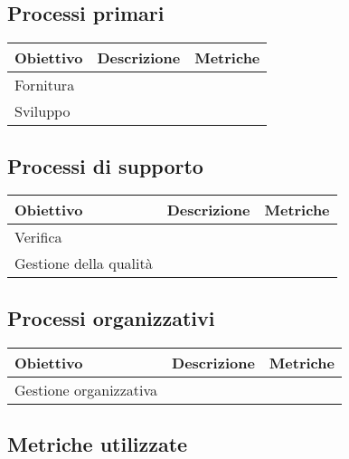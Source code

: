 \documentclass[10pt, a4paper]{article}
\begin{document}
\subsection{Processi primari}
    {\renewcommand{\arraystretch}{1.5}
    \begin{tabularx}{\textwidth}{p{}|p{}|X}
    \textbf{Obiettivo} & \textbf{Descrizione} & \textbf{Metriche}  \\
    \hline
    Fornitura &  & \\
    \hline
    Sviluppo &  &  \\
    \end{tabularx}}

\subsection{Processi di supporto}
    {\renewcommand{\arraystretch}{1.5}
    \begin{tabularx}{\textwidth}{p{}|p{}|X}
    \textbf{Obiettivo} & \textbf{Descrizione} & \textbf{Metriche}  \\
    \hline
    Verifica &  &  \\
    \hline
    Gestione della qualità &  &  \\
    \end{tabularx}}
    
\subsection{Processi organizzativi}
    {\renewcommand{\arraystretch}{1.5}
    \begin{tabularx}{\textwidth}{p{}|p{}|X}
    \textbf{Obiettivo} & \textbf{Descrizione} & \textbf{Metriche}  \\
    \hline
    Gestione organizzativa &  &  \\
    \end{tabularx}}
    
\subsection{Metriche utilizzate}
\end{document}
